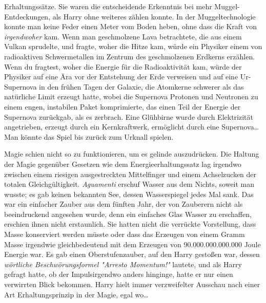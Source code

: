 {Erhaltungssätze. Sie waren die entscheidende Erkenntnis bei mehr Muggel-Entdeckungen, als Harry ohne weiteres zählen konnte. In der Muggeltechnologie konnte man keine Feder einen Meter vom Boden heben, ohne dass die Kraft von \emph{irgendwoher} kam. Wenn man geschmolzene Lava betrachtete, die aus einem Vulkan sprudelte, und fragte, woher die Hitze kam, würde ein Physiker einem von radioaktiven Schwermetallen im Zentrum des geschmolzenen Erdkerns erzählen. Wenn du fragtest, woher die Energie für die Radioaktivität kam, würde der Physiker auf eine Ära vor der Entstehung der Erde verweisen und auf eine Ur-Supernova in den frühen Tagen der Galaxie, die Atomkerne schwerer als das natürliche Limit erzeugt hatte, wobei die Supernova Protonen und Neutronen zu einem engen, instabilen Paket komprimierte, das einen Teil der Energie der Supernova zurückgab, als es zerbrach. Eine Glühbirne wurde durch Elektrizität angetrieben, erzeugt durch ein Kernkraftwerk, ermöglicht durch eine Supernova… Man könnte das Spiel bis zurück zum Urknall spielen.

Magie schien nicht so zu funktionieren, um es gelinde auszudrücken. Die Haltung der Magie gegenüber Gesetzen wie dem Energieerhaltungssatz lag irgendwo zwischen einem riesigen ausgestreckten Mittelfinger und einem Achselzucken der totalen Gleichgültigkeit. \emph{Aguamenti} erschuf Wasser aus dem Nichts, soweit man wusste; es gab keinen bekannten See, dessen Wasserspiegel jedes Mal sank. Das war ein einfacher Zauber aus dem fünften Jahr, der von Zauberern nicht als beeindruckend angesehen wurde, denn ein einfaches Glas Wasser zu erschaffen, erschien ihnen nicht erstaunlich. Sie hatten nicht die verrückte Vorstellung, dass Masse konserviert werden müsste oder dass das Erzeugen von einem Gramm Masse irgendwie gleichbedeutend mit dem Erzeugen von 90.000.000.000.000 Joule Energie war. Es gab einen Oberstufenzauber, auf den Harry gestoßen war, dessen \emph{wörtliche Beschwörungsformel "Arresto Momentum!"} lautete, und als Harry gefragt hatte, ob der Impulsirgendwo anders hinginge, hatte er nur einen verwirrten Blick bekommen. Harry hielt immer verzweifelter Ausschau nach einer Art Erhaltungsprinzip in der Magie, egal wo…

}

